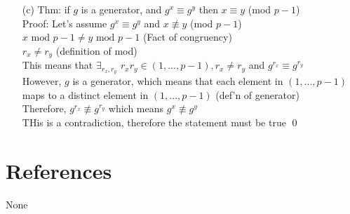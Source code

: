 \documentclass[11pt]{article}
\theoremstyle{definition}
\begin{document}
\begin{enumerate}
	\item[(c)]
	Thm: if $g$ is a generator, and $g^x \equiv g^y$ then $x \equiv y$ (mod $p-1$)\\
	\newline
	Proof: Let's assume $g^x \equiv g^y$ and $x \not\equiv y$ (mod $p-1$)\\
	$x \text{ mod } p-1 \neq y \text{ mod } p-1$ (Fact of congruency)\\
	$r_x \neq r_y$ (definition of mod)\\
	This means that $\exists_{r_x,r_y}$ $r_xr_y \in (1,...,p-1), r_x \neq r_y$ and $g^{r_x} \equiv g^{r_y}$\\
	However, $g$ is a generator, which means that each element in $(1,...,p-1)$ maps to a distinct element in $(1,...,p-1)$ (def'n of generator)\\
	Therefore, $g^{r_x} \not\equiv g^{r_y}$ which means $g^x \not\equiv g^y$\\
	THis is a contradiction, therefore the statement must be true
	\qed


\end{enumerate}


\noindent\hrulefill


\section*{References}

None
\end{document}
